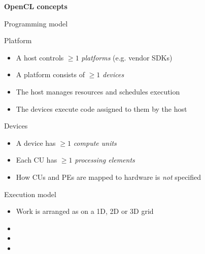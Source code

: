 \documentclass[18pt]{beamer}
\begin{document}
\begin{frame}{}
  \begin{center}
    \huge\bfseries
    \textcolor{KITblack50}{OpenCL concepts}
  \end{center}
\end{frame}
\begin{frame}{Programming model}
  \begin{block}{Platform}
    \begin{itemize}
      \item A host controls $\geq 1$ \emph{platforms} (e.g. vendor SDKs)
      \item A platform consists of $\geq 1$ \emph{devices}
      \item The host manages resources and schedules execution
      \item The devices execute code assigned to them by the host
    \end{itemize}
  \end{block}

  \pause

  \begin{block}{Devices}
    \begin{itemize}
      \item A device has $\geq 1$ \emph{compute units}
      \item Each CU has $\geq 1$ \emph{processing elements}
      \item How CUs and PEs are mapped to hardware is \emph{not} specified
    \end{itemize}
  \end{block}
\end{frame}
\begin{frame}{Execution model}
  \begin{itemize}
    \item Work is arranged as  on a 1D, 2D or 3D grid
    \item
    \item {}
    \item {}
  \end{itemize}
  \begin{center}
  \end{center}
\end{frame}
\end{document}

